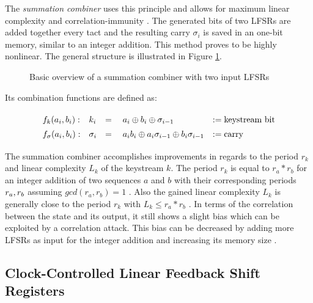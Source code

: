 The \emph{summation combiner} uses this principle and allows for maximum linear complexity and correlation-immunity \cite[p. 261]{Rueppel.1986b}. The generated bits of two LFSRs are added together every tact and the resulting carry $\sigma_i$ is saved in an one-bit memory, similar to an integer addition. This method proves to be highly nonlinear. The general structure is illustrated in Figure \ref{fig:summation-combiner}. \cite[p. 70]{Meier.1992} \\

\begin{figure}[htbp]
	\centering
	
	\caption{Basic overview of a summation combiner with two input LFSRs}
	\label{fig:summation-combiner}
\end{figure}

\vspace{0,7cm}

Its combination functions are defined as:

\[\def\arraystretch{1.4}\begin{array}{llll}
	f_k(a_i, b_i): & k_i &= \quad a_i \oplus b_i \oplus \sigma_{i-1} &:= \text{keystream bit}\\
	f_\sigma(a_i, b_i): & \sigma_{i} &= \quad a_ib_i \oplus a_i\sigma_{i-1} \oplus b_i\sigma_{i-1} &:= \text{carry}\\
\end{array}\]

\vspace{0,4cm}

The summation combiner accomplishes improvements in regards to the period $r_k$ and linear complexity $L_k$ of the keystream $k$. The period $r_k$ is equal to $r_a*r_b$ for an integer addition of two sequences $a$ and $b$ with their corresponding periods $r_a, \space r_b$ assuming $gcd(r_a,r_b)=1$ \cite[p. 220]{Rueppel.1986}. Also the gained linear complexity $L_k$ is generally close to the period $r_k$ with $L_k \leq r_a*r_b$ \cite[p. 225]{Rueppel.1986}. In terms of the correlation between the state and its output, it still shows a slight bias which can be exploited by a correlation attack. This bias can be decreased by adding more LFSRs as input for the integer addition and increasing its memory size \cite[pp. 81-82]{Meier.1992}. \\

\subsection{Clock-Controlled Linear Feedback Shift Registers}

